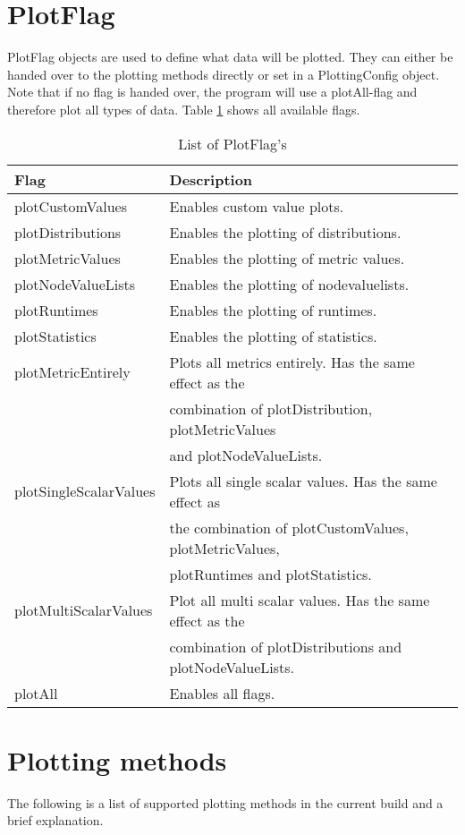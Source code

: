 \section{PlotFlag}
PlotFlag objects are used to define what data will be plotted. They can either be handed over to the plotting methods directly or set in a PlottingConfig object. Note that if no flag is handed over, the program will use a plotAll-flag and therefore plot all types of data. Table \ref{tab:plot-flags} shows all available flags.

\begin{table}[h]
\centering
\begin{tabular}[h]{|l|l|}\hline
	\textbf{Flag} & \textbf{Description}\\
	\hline
	plotCustomValues & Enables custom value plots.\\
	\hline
	plotDistributions & Enables the plotting of distributions.\\
	\hline
	plotMetricValues & Enables the plotting of metric values.\\
	\hline
	plotNodeValueLists & Enables the plotting of nodevaluelists.\\
	\hline
	plotRuntimes & Enables the plotting of runtimes.\\
	\hline
	plotStatistics & Enables the plotting of statistics.\\
	\hline
	plotMetricEntirely & Plots all metrics entirely. Has the same effect as the\\
	& combination of plotDistribution, plotMetricValues\\
	& and plotNodeValueLists. \\
	\hline
	plotSingleScalarValues & Plots all single scalar values. Has the same effect as\\
	& the combination of plotCustomValues, plotMetricValues,\\
	& plotRuntimes and plotStatistics.\\
	\hline
	plotMultiScalarValues & Plot all multi scalar values. Has the same effect as the\\
	& combination of plotDistributions and plotNodeValueLists.\\
	\hline
	plotAll & Enables all flags.\\
	\hline
\end{tabular}
\caption{List of PlotFlag's}
\label{tab:plot-flags}
\end{table}

\section{Plotting methods}
\label{sec:methods}
The following is a list of supported plotting methods in the current build and a brief explanation.

